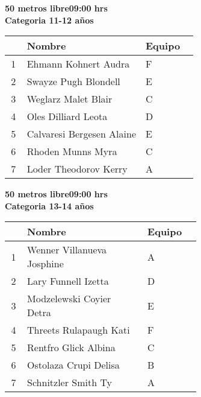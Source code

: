 \begin{minipage}{0.95\linewidth}\vspace{0.5cm} 
\begin{flushleft}
\textbf{
\hspace{-0.15cm}50 metros libre\hspace{1.5cm}09:00 hrs \\Categoria 11-12 años}\vspace{-0.2cm} 
\end{flushleft}
\begin{tabular}{cp{0.63\linewidth}l}
\hline
& \textbf{Nombre} & \textbf{Equipo} \\ \hline
1 & Ehmann Kohnert Audra & F \\ 
2 & Swayze Pugh Blondell & E \\ 
3 & Weglarz Malet Blair & C \\ 
4 & Oles Dilliard Leota & D \\ 
5 & Calvaresi Bergesen Alaine & E \\ 
6 & Rhoden Munns Myra & C \\ 
7 & Loder Theodorov Kerry & A \\ 
\end{tabular}
\end{minipage}
\begin{minipage}{0.95\linewidth}\vspace{0.5cm} 
\begin{flushleft}
\textbf{
\hspace{-0.15cm}50 metros libre\hspace{1.5cm}09:00 hrs \\Categoria 13-14 años}\vspace{-0.2cm} 
\end{flushleft}
\begin{tabular}{cp{0.63\linewidth}l}
\hline
& \textbf{Nombre} & \textbf{Equipo} \\ \hline
1 & Wenner Villanueva Josphine & A \\ 
2 & Lary Funnell Izetta & D \\ 
3 & Modzelewski Coyier Detra & E \\ 
4 & Threets Rulapaugh Kati & F \\ 
5 & Rentfro Glick Albina & C \\ 
6 & Ostolaza Crupi Delisa & B \\ 
7 & Schnitzler Smith Ty & A \\ 
\end{tabular}
\end{minipage}

